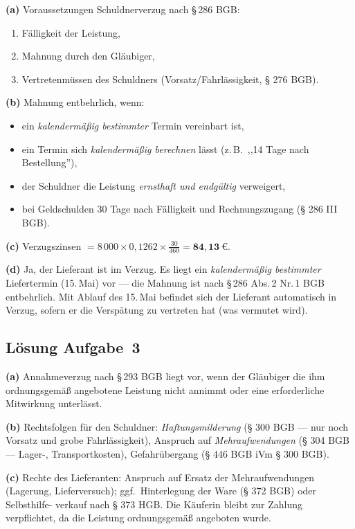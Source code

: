 \documentclass[11pt, a4paper]{article}
\begin{document}
\begin{loesung}
\textbf{(a)} Voraussetzungen Schuldnerverzug nach §\,286 BGB:
\begin{enumerate}[itemsep=0pt]
  \item Fälligkeit der Leistung,
  \item Mahnung durch den Gläubiger,
  \item Vertretenmüssen des Schuldners (Vorsatz/Fahrlässigkeit, § 276 BGB).
\end{enumerate}

\textbf{(b)} Mahnung entbehrlich, wenn:
\begin{itemize}[itemsep=0pt]
  \item ein \emph{kalendermäßig bestimmter} Termin vereinbart ist,
  \item ein Termin sich \emph{kalendermäßig berechnen} lässt (z.\,B.\ ,,14 Tage nach Bestellung''),
  \item der Schuldner die Leistung \emph{ernsthaft und endgültig} verweigert,
  \item bei Geldschulden 30 Tage nach Fälligkeit und Rechnungszugang (§ 286 III BGB).
\end{itemize}

\textbf{(c)} Verzugszinsen $= 8\,000 \times 0{,}1262 \times \frac{30}{360} = \mathbf{84{,}13~€}$.

\textbf{(d)} Ja, der Lieferant ist im Verzug. Es liegt ein \emph{kalendermäßig bestimmter}
Liefertermin (15.\,Mai) vor --- die Mahnung ist nach §\,286 Abs.\,2 Nr.\,1 BGB entbehrlich.
Mit Ablauf des 15.\,Mai befindet sich der Lieferant automatisch in Verzug, sofern er
die Verspätung zu vertreten hat (was vermutet wird).
\end{loesung}

\subsection*{Lösung Aufgabe~3}

\begin{loesung}
\textbf{(a)} Annahmeverzug nach §\,293 BGB liegt vor, wenn der Gläubiger die ihm
ordnungsgemäß angebotene Leistung nicht annimmt oder eine erforderliche Mitwirkung
unterlässt.

\textbf{(b)} Rechtsfolgen für den Schuldner: \emph{Haftungsmilderung} (§ 300 BGB ---
nur noch Vorsatz und grobe Fahrlässigkeit), Anspruch auf \emph{Mehraufwendungen}
(§ 304 BGB --- Lager-, Transportkosten), Gefahrübergang (§ 446 BGB iVm § 300 BGB).

\textbf{(c)} Rechte des Lieferanten: Anspruch auf Ersatz der Mehraufwendungen
(Lagerung, Lieferversuch); ggf.\ Hinterlegung der Ware (§ 372 BGB) oder Selbsthilfe-
verkauf nach § 373 HGB. Die Käuferin bleibt zur Zahlung verpflichtet, da die Leistung
ordnungsgemäß angeboten wurde.
\end{loesung}
\end{document}
